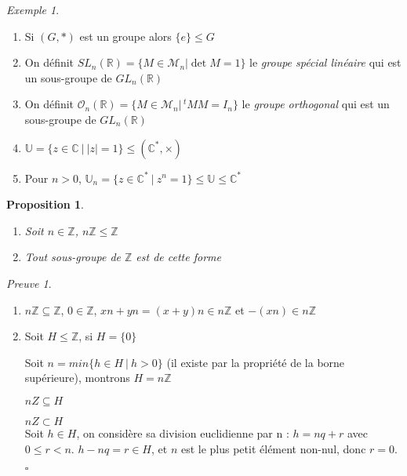\documentclass[]{article}
\newtheorem{myproposition}{Proposition}
\theoremstyle{remark}
\newtheorem{myproof}{Preuve}
\newtheorem{myexmpl}{Exemple}
\theoremstyle{definition}
\newcommand{\cqfd}{
	\hfill$\square$
}
\newenvironment{proofpart}[1]{
	\noindent
	{\textbf{\boldmath #1}}
}{
	\checkmark
}
\begin{document}
\begin{myexmpl}
	\begin{enumerate}
		\item Si $(G, *)$ est un groupe alors $\{e\} \leqslant G$
		\item On définit $SL_n(\mathbb{R})=\{M \in \mathcal{M}_n | \det M = 1\}$ le \textit{groupe spécial linéaire} qui est un sous-groupe de $GL_n(\mathbb{R})$
		\item On définit $\mathcal{O}_n(\mathbb{R})=\{M \in \mathcal{M}_n | \,^tMM = I_n\}$ le \textit{groupe orthogonal} qui est un sous-groupe de $GL_n(\mathbb{R})$
		\item $\mathbb{U} = \{z \in \mathbb{C} ~ | ~ |z| = 1\} \leqslant (\mathbb{C}^*, \times)$
		\item Pour $n > 0$, $\mathbb{U}_n = \{z \in \mathbb{C}^* ~ | ~ z^n = 1\} \leqslant \mathbb{U} \leqslant \mathbb{C}^*$
	\end{enumerate}
\end{myexmpl}

\begin{myproposition}
	\leavevmode
	\begin{enumerate}
		\item Soit $n \in \mathbb{Z}$, $n\mathbb{Z} \leqslant \mathbb{Z}$
		\item Tout sous-groupe de $\mathbb{Z}$ est de cette forme
	\end{enumerate}
\end{myproposition}

\begin{myproof}
	\leavevmode
	\begin{enumerate}
		\item $n\mathbb{Z} \subseteq \mathbb{Z}$, $0 \in \mathbb{Z}$, $xn + yn = (x+y)n \in n\mathbb{Z}$ et $-(xn) \in n\mathbb{Z}$
		\item Soit $H \leqslant \mathbb{Z}$, si $H = \{0\}$ \checkmark
		
		Soit $n = min\{h \in H ~|~ h > 0\}$ (il existe par la propriété de la borne supérieure), montrons $H = n\mathbb{Z}$

		\begin{proofpart}{$nZ \subseteq H$}
		\end{proofpart}

		\begin{proofpart}{$nZ \subset H$}\\			
			Soit $h \in H$, on considère sa division euclidienne par n : $h = nq + r$ avec $0 \leqslant r < n$.
			$h - nq = r\in H$, et $n$ est le plus petit élément non-nul, donc $r = 0$.
		\end{proofpart}
		
		\cqfd
	\end{enumerate}
\end{myproof}
\end{document}
